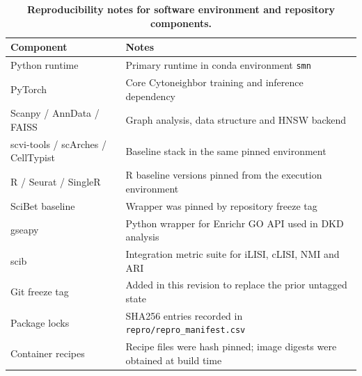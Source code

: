 \documentclass[11pt]{article}
\begin{document}
\begin{table}[htbp]
\centering
\caption{\textbf{Reproducibility notes for software environment and repository components.}}
\label{tab:s16_software_notes}
\scriptsize
\begin{tabularx}{\textwidth}{@{}L{0.24\textwidth} Y@{}}
\toprule
\textbf{Component} & \textbf{Notes} \\
\midrule
Python runtime & Primary runtime in conda environment \texttt{smn} \\
PyTorch & Core Cytoneighbor training and inference dependency \\
Scanpy / AnnData / FAISS & Graph analysis, data structure and HNSW backend \\
scvi-tools / scArches / CellTypist & Baseline stack in the same pinned environment \\
R / Seurat / SingleR & R baseline versions pinned from the execution environment \\
SciBet baseline & Wrapper was pinned by repository freeze tag \\
gseapy & Python wrapper for Enrichr GO API used in DKD analysis \\
scib & Integration metric suite for iLISI, cLISI, NMI and ARI \\
Git freeze tag & Added in this revision to replace the prior untagged state \\
Package locks & SHA256 entries recorded in \texttt{repro/repro\_manifest.csv} \\
Container recipes & Recipe files were hash pinned; image digests were obtained at build time \\
\bottomrule
\end{tabularx}
\end{table}

\FloatBarrier
\end{document}
